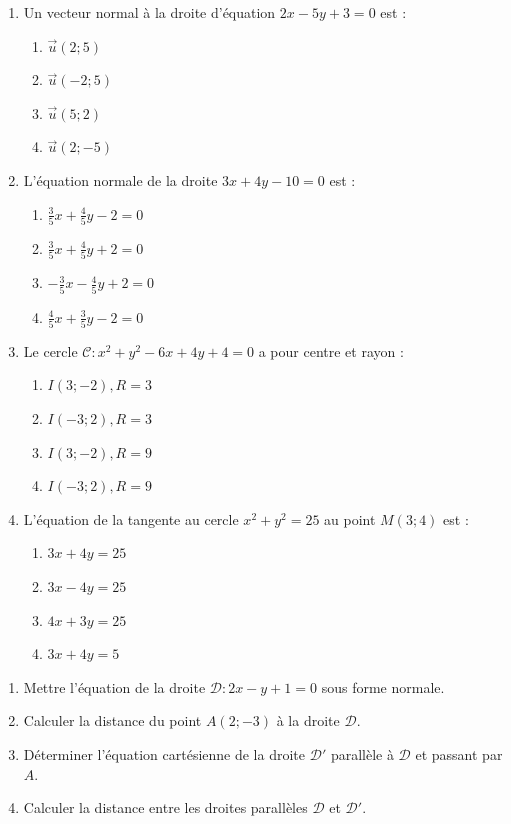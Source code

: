 \documentclass[11pt]{article}
\begin{document}
\begin{exercice}
\begin{enumerate}
    \item Un vecteur normal à la droite d'équation $2x-5y+3=0$ est :
    \begin{enumerate}
        \item $\vec{u}(2;5)$
        \item $\vec{u}(-2;5)$
        \item $\vec{u}(5;2)$
        \item $\vec{u}(2;-5)$
    \end{enumerate}
    \item L'équation normale de la droite $3x+4y-10=0$ est :
    \begin{enumerate}
        \item $\frac{3}{5}x+\frac{4}{5}y-2=0$
        \item $\frac{3}{5}x+\frac{4}{5}y+2=0$
        \item $-\frac{3}{5}x-\frac{4}{5}y+2=0$
        \item $\frac{4}{5}x+\frac{3}{5}y-2=0$
    \end{enumerate}
    \item Le cercle $\mathcal{C}: x^2+y^2-6x+4y+4=0$ a pour centre et rayon :
    \begin{enumerate}
        \item $I(3;-2), R=3$
        \item $I(-3;2), R=3$
        \item $I(3;-2), R=9$
        \item $I(-3;2), R=9$
    \end{enumerate}
    \item L'équation de la tangente au cercle $x^2+y^2=25$ au point $M(3;4)$ est :
    \begin{enumerate}
        \item $3x+4y=25$
        \item $3x-4y=25$
        \item $4x+3y=25$
        \item $3x+4y=5$
    \end{enumerate}
\end{enumerate}
\end{exercice}

\begin{exercice}
\begin{enumerate}
    \item Mettre l'équation de la droite $\mathcal{D}: 2x-y+1=0$ sous forme normale.
    \item Calculer la distance du point $A(2;-3)$ à la droite $\mathcal{D}$.
    \item Déterminer l'équation cartésienne de la droite $\mathcal{D}'$ parallèle à $\mathcal{D}$ et passant par $A$.
    \item Calculer la distance entre les droites parallèles $\mathcal{D}$ et $\mathcal{D}'$.
\end{enumerate}
\end{exercice}
\end{document}
